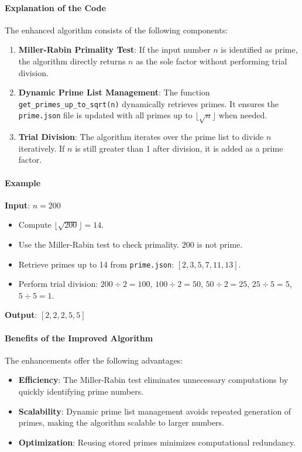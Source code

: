 \documentclass[12pt]{report}
\begin{document}
\paragraph{Explanation of the Code}

The enhanced algorithm consists of the following components:
\begin{enumerate}
    \item \textbf{Miller-Rabin Primality Test}: If the input number $n$ is identified as prime, the algorithm directly returns $n$ as the sole factor without performing trial division.
    \item \textbf{Dynamic Prime List Management}: The function \texttt{get\_primes\_up\_to\_sqrt(n)} dynamically retrieves primes. It ensures the \texttt{prime.json} file is updated with all primes up to $\lfloor \sqrt{n} \rfloor$ when needed.
    \item \textbf{Trial Division}: The algorithm iterates over the prime list to divide $n$ iteratively. If $n$ is still greater than 1 after division, it is added as a prime factor.
\end{enumerate}

\paragraph{Example}

\textbf{Input}: $n = 200$

\begin{itemize}
    \item Compute $\lfloor \sqrt{200} \rfloor = 14$.
    \item Use the Miller-Rabin test to check primality. $200$ is not prime.
    \item Retrieve primes up to 14 from \texttt{prime.json}: $[2, 3, 5, 7, 11, 13]$.
    \item Perform trial division: $200 \div 2 = 100$, $100 \div 2 = 50$, $50 \div 2 = 25$, $25 \div 5 = 5$, $5 \div 5 = 1$.
\end{itemize}

\textbf{Output}: $[2, 2, 2, 5, 5]$

\paragraph{Benefits of the Improved Algorithm}

The enhancements offer the following advantages:
\begin{itemize}
    \item \textbf{Efficiency}: The Miller-Rabin test eliminates unnecessary computations by quickly identifying prime numbers.
    \item \textbf{Scalability}: Dynamic prime list management avoids repeated generation of primes, making the algorithm scalable to larger numbers.
    \item \textbf{Optimization}: Reusing stored primes minimizes computational redundancy.
\end{itemize}
\end{document}
